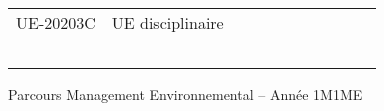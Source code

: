 \documentclass[a4paper,11pt]{article}
\begin{document}
{{\begin{tabular}{lllllllllll}
\rowcolor[HTML]{C0C0C0} 
UE-20203C                      & UE disciplinaire                                   &                           &                           &                           &                                    &                             &                             &                                    &                                  &                                  \\
                               &                                                    &                           &                           &                           &                                    &                             &                             &                                    &                                  &                                  \\
                               &                                                    &                           &                           &                           &                                    &                             &                             &                                    &                                  &                                  \\
                               &                                                    &                           &                           &                           &                                    &                             &                             &                                    &                                  &                                  \\
                               &                                                    &                           &                           &                           &                                    &                             &                             &                                    &                                  &                                  \\
                               &                                                    &                           &                           &                           &                                    &                             &                             &                                    &                                  &                                 
\end{tabular}
}
}{Parcours Management Environnemental -- Année 1}{M1ME}
\end{document}
